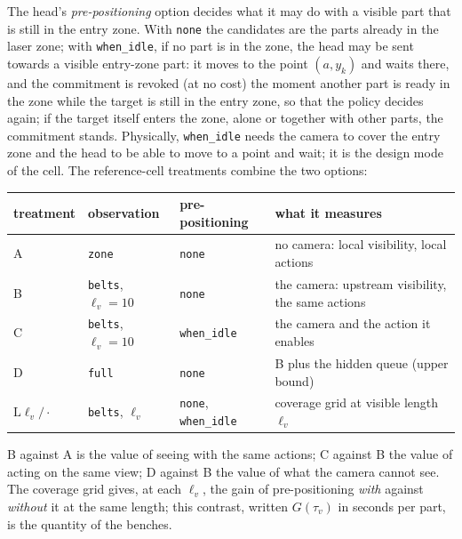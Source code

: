 \documentclass[11pt,a4paper]{article}
\newcommand{\tv}{\tau_{v}}
\newcommand{\lv}{\ell_{v}}
\begin{document}
The head's \emph{pre-positioning} option decides what it may do with a visible part that
is still in the entry zone. With \texttt{none} the candidates are the parts already in
the laser zone; with \texttt{when\_idle}, if no part is in the zone, the head may be sent
towards a visible entry-zone part: it moves to the point $(a,y_k)$ and waits there, and
the commitment is revoked (at no cost) the moment another part is ready in the zone while
the target is still in the entry zone, so that the policy decides again; if the target
itself enters the zone, alone or together with other parts, the commitment stands.
Physically, \texttt{when\_idle} needs the camera to cover the entry zone and the head to be
able to move to a point and wait; it is the design mode of the cell. The reference-cell
treatments combine the two options:
\begin{center}
\small
\begin{tabularx}{\linewidth}{@{}l l l X@{}}
\toprule
treatment & observation & pre-positioning & what it measures\\
\midrule
A & \texttt{zone} & \texttt{none} & no camera: local visibility, local actions\\
B & \texttt{belts}, $\lv=10$ & \texttt{none} & the camera: upstream visibility, the same actions\\
C & \texttt{belts}, $\lv=10$ & \texttt{when\_idle} & the camera and the action it enables\\
D & \texttt{full} & \texttt{none} & B plus the hidden queue (upper bound)\\
$\mathrm{L}\lv/\cdot$ & \texttt{belts}, $\lv$ & \texttt{none}, \texttt{when\_idle} & coverage grid at visible length $\lv$\\
\bottomrule
\end{tabularx}
\end{center}
B against A is the value of seeing with the same actions; C against B the value of acting
on the same view; D against B the value of what the camera cannot see. The coverage grid
gives, at each $\lv$, the gain of pre-positioning \emph{with} against \emph{without} it at
the same length; this contrast, written $G(\tv)$ in seconds per part, is the quantity of
the benches.
\end{document}
